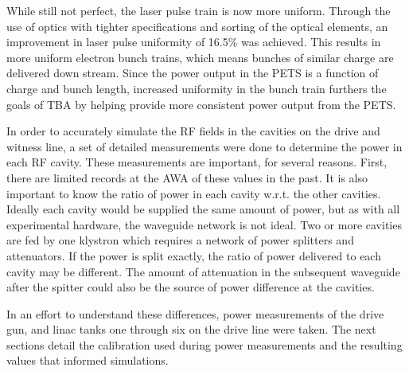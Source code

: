 While still not perfect, the laser pulse train is now more uniform.
Through the use of optics with tighter specifications and sorting of the optical elements, 
an improvement in laser pulse uniformity of 16.5\% was achieved.
This results in more uniform electron bunch trains, which means bunches 
of similar charge are delivered down stream. 
Since the power output in the PETS is a function of charge and bunch length, 
increased uniformity in the bunch train furthers the goals of TBA 
by helping provide more consistent power output from the PETS.


In order to accurately simulate the RF fields in the cavities on the drive and witness line, 
a set of detailed measurements were done to determine the power in each RF cavity.
These measurements are important, for several reasons. 
First, there are limited records at the AWA of these values in the past.
It is also important to know the ratio of power in each cavity w.r.t. the other cavities.
Ideally each cavity would be supplied the same amount of power, 
but as with all experimental hardware, the waveguide network is not ideal.
Two or more cavities are fed by one klystron which requires a network of 
power splitters and attenuators. If the power is split exactly, the ratio 
of power delivered to each cavity may be different. 
The amount of attenuation in the subsequent waveguide after the spitter could
also be the source of power difference at the cavities.
 
In an effort to understand these differences, 
power measurements of the drive gun, and linac tanks 
one through six on the drive line were taken.
The next sections detail the calibration used during power measurements and the 
resulting values that informed simulations. 

